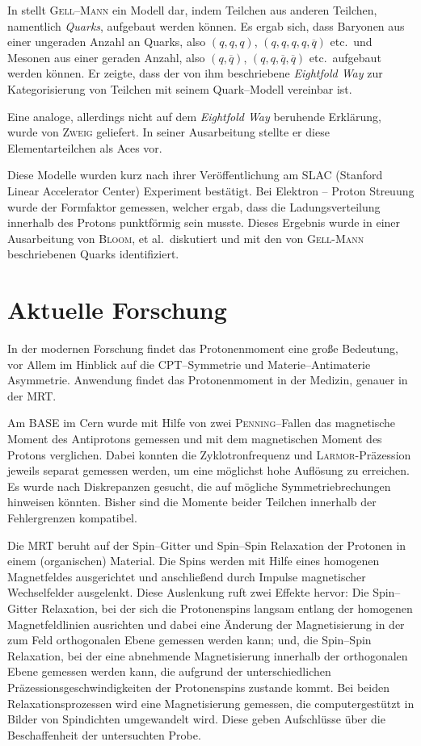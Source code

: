 \documentclass[sn-mathphys-num,iicol]{sn-jnl}
\theoremstyle{thmstyleone}
\theoremstyle{thmstyletwo}
\theoremstyle{thmstylethree}
\begin{document}
In \cite{Gellmann1964} stellt \textsc{Gell--Mann} ein Modell dar, indem Teilchen aus anderen Teilchen, namentlich \textit{Quarks}, aufgebaut werden können.
Es ergab sich, dass Baryonen aus einer ungeraden Anzahl an Quarks, also $\left(q,q,q\right)$, $\left(q,q,q,q,\overline{q}\right)$ etc.\ und Mesonen aus einer geraden Anzahl, also $\left(q,\overline{q}\right)$, $\left(q,q,\overline{q},\overline{q}\right)$ etc.\ aufgebaut werden können.
Er zeigte, dass der von ihm beschriebene \textit{Eightfold Way} zur Kategorisierung von Teilchen mit seinem Quark--Modell vereinbar ist.

Eine analoge, allerdings nicht auf dem \textit{Eightfold Way} beruhende Erklärung, wurde von \textsc{Zweig}\cite{Zweig1964} geliefert.
In seiner Ausarbeitung stellte er diese Elementarteilchen als Aces vor.

Diese Modelle wurden kurz nach ihrer Veröffentlichung am SLAC (Stanford Linear Accelerator Center) Experiment bestätigt.\cite{Bloom1969}
Bei Elektron -- Proton Streuung wurde der Formfaktor gemessen, welcher ergab, dass die Ladungsverteilung innerhalb des Protons punktförmig sein musste.
Dieses Ergebnis wurde in einer Ausarbeitung \cite{Bloom1969} von \textsc{Bloom}, et al.\ diskutiert und mit den von \textsc{Gell-Mann} beschriebenen Quarks identifiziert.

\section{Aktuelle Forschung}
In der modernen Forschung findet das Protonenmoment eine große Bedeutung, vor Allem im Hinblick auf die CPT--Symmetrie und Materie--Antimaterie Asymmetrie.
Anwendung findet das Protonenmoment in der Medizin, genauer in der MRT.

Am BASE im Cern\cite{BASE2017} wurde mit Hilfe von zwei \textsc{Penning}--Fallen das magnetische Moment des Antiprotons gemessen und mit dem magnetischen Moment des Protons verglichen.
Dabei konnten die Zyklotronfrequenz und \textsc{Larmor}-Präzession jeweils separat gemessen werden, um eine möglichst hohe Auflösung zu erreichen.
Es wurde nach Diskrepanzen gesucht, die auf mögliche Symmetriebrechungen hinweisen könnten.
Bisher sind die Momente beider Teilchen innerhalb der Fehlergrenzen kompatibel.

Die MRT beruht auf der Spin--Gitter und Spin--Spin Relaxation der Protonen in einem (organischen) Material.
Die Spins werden mit Hilfe eines homogenen Magnetfeldes ausgerichtet und anschließend durch Impulse magnetischer Wechselfelder ausgelenkt.
Diese Auslenkung ruft zwei Effekte hervor:
Die Spin--Gitter Relaxation, bei der sich die Protonenspins langsam entlang der homogenen Magnetfeldlinien ausrichten und dabei eine Änderung der Magnetisierung in der zum Feld orthogonalen Ebene gemessen werden kann;
und, die Spin--Spin Relaxation, bei der eine abnehmende Magnetisierung innerhalb der orthogonalen Ebene gemessen werden kann, die aufgrund der unterschiedlichen Präzessionsgeschwindigkeiten der Protonenspins zustande kommt.
Bei beiden Relaxationsprozessen wird eine Magnetisierung gemessen, die computergestützt in Bilder von Spindichten umgewandelt wird.
Diese geben Aufschlüsse über die Beschaffenheit der untersuchten Probe.


\end{document}
